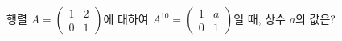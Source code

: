 행렬 $A=\begin{pmatrix} 1 & 2 \\ 0 & 1 \end{pmatrix}$에 대하여 $A^{10}=\begin{pmatrix} 1 & a \\ 0 & 1 \end{pmatrix}$일 때, 상수 $a$의 값은?
